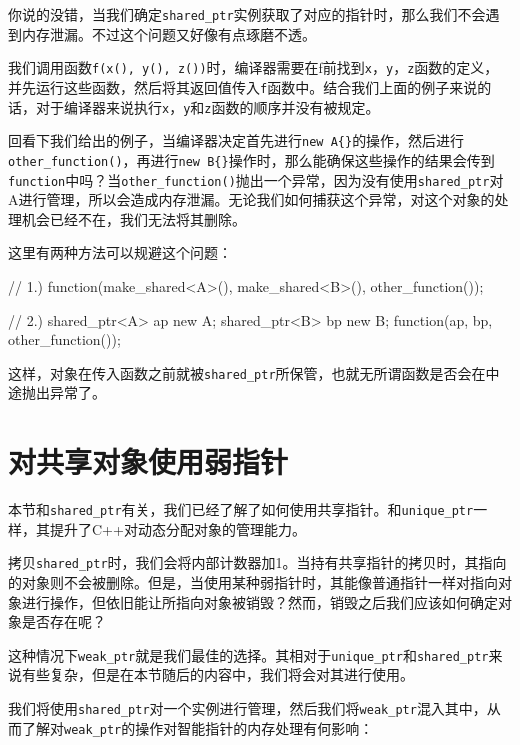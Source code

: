 你说的没错，当我们确定\texttt{shared\_ptr}实例获取了对应的指针时，那么我们不会遇到内存泄漏。不过这个问题又好像有点琢磨不透。

我们调用函数\texttt{f(x(), y(), z())}时，编译器需要在f前找到\texttt{x}，\texttt{y}，\texttt{z}函数的定义，并先运行这些函数，然后将其返回值传入\texttt{f}函数中。结合我们上面的例子来说的话，对于编译器来说执行\texttt{x}，\texttt{y}和\texttt{z}函数的顺序并没有被规定。

回看下我们给出的例子，当编译器决定首先进行\texttt{new A\{\}}的操作，然后进行\texttt{other\_function()}，再进行\texttt{new B\{\}}操作时，那么能确保这些操作的结果会传到\texttt{function}中吗？当\texttt{other\_function()}抛出一个异常，因为没有使用\texttt{shared\_ptr}对A进行管理，所以会造成内存泄漏。无论我们如何捕获这个异常，对这个对象的处理机会已经不在，我们无法将其删除。

这里有两种方法可以规避这个问题：

\begin{codebox}[cpp]
// 1.)
function(make_shared<A>(), make_shared<B>(), other_function());

// 2.)
shared_ptr<A> ap {new A{}};
shared_ptr<B> bp {new B{}};
function(ap, bp, other_function());
\end{codebox}

这样，对象在传入函数之前就被\texttt{shared\_ptr}所保管，也就无所谓函数是否会在中途抛出异常了。


\section{对共享对象使用弱指针}

本节和\texttt{shared\_ptr}有关，我们已经了解了如何使用共享指针。和\texttt{unique\_ptr}一样，其提升了C++对动态分配对象的管理能力。

拷贝\texttt{shared\_ptr}时，我们会将内部计数器加1。当持有共享指针的拷贝时，其指向的对象则不会被删除。但是，当使用某种弱指针时，其能像普通指针一样对指向对象进行操作，但依旧能让所指向对象被销毁？然而，销毁之后我们应该如何确定对象是否存在呢？

这种情况下\texttt{weak\_ptr}就是我们最佳的选择。其相对于\texttt{unique\_ptr}和\texttt{shared\_ptr}来说有些复杂，但是在本节随后的内容中，我们将会对其进行使用。


我们将使用\texttt{shared\_ptr}对一个实例进行管理，然后我们将\texttt{weak\_ptr}混入其中，从而了解对\texttt{weak\_ptr}的操作对智能指针的内存处理有何影响：

